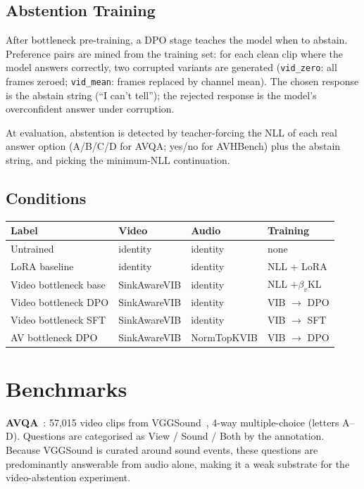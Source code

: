 \documentclass[11pt,a4paper]{article}
\begin{document}
\subsection{Abstention Training}

After bottleneck pre-training, a DPO stage teaches the model when to abstain.
Preference pairs are mined from the training set: for each clean clip where the
model answers correctly, two corrupted variants are generated
(\texttt{vid\_zero}: all frames zeroed; \texttt{vid\_mean}: frames replaced by
channel mean).  The chosen response is the abstain string
(``I can't tell''); the rejected response is the model's overconfident answer
under corruption.

At evaluation, abstention is detected by teacher-forcing the NLL of each real
answer option (A/B/C/D for AVQA; yes/no for AVHBench) plus the abstain string,
and picking the minimum-NLL continuation.

\subsection{Conditions}

\begin{center}
\begin{tabular}{lllp{4.2cm}}
\toprule
\textbf{Label} & \textbf{Video} & \textbf{Audio} & \textbf{Training} \\
\midrule
Untrained              & identity     & identity    & none \\
LoRA baseline          & identity     & identity    & NLL + LoRA \\
Video bottleneck base  & SinkAwareVIB & identity    & NLL $+ \beta_v$KL \\
Video bottleneck DPO   & SinkAwareVIB & identity    & VIB $\to$ DPO \\
Video bottleneck SFT   & SinkAwareVIB & identity    & VIB $\to$ SFT \\
AV bottleneck DPO      & SinkAwareVIB & NormTopKVIB & VIB $\to$ DPO \\
\bottomrule
\end{tabular}
\end{center}

\section{Benchmarks}

\textbf{AVQA}~\cite{yang2022avqa}: 57,015 video clips from
VGGSound~\cite{vggsound2020}, 4-way multiple-choice (letters A--D).
Questions are categorised as View / Sound / Both by the annotation.
Because VGGSound is curated around sound events, these questions are
predominantly answerable from audio alone, making it a weak substrate for
the video-abstention experiment.
\end{document}
